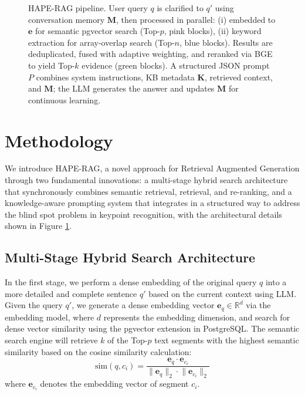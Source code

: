 \documentclass[10pt,twocolumn,letterpaper]{article}
\begin{document}
\begin{figure}[!htbp]
    \centering
    
    \caption{HAPE-RAG pipeline. User query $q$ is clarified to $q'$ using conversation memory $\mathbf{M}$, then processed in parallel: (i) embedded to $\mathbf{e}$ for semantic pgvector search (Top-$p$, pink blocks), (ii) keyword extraction for array-overlap search (Top-$n$, blue blocks). Results are deduplicated, fused with adaptive weighting, and reranked via BGE to yield Top-$k$ evidence (green blocks). A structured JSON prompt $P$ combines system instructions, KB metadata $\mathbf{K}$, retrieved context, and $\mathbf{M}$; the LLM generates the answer and updates $\mathbf{M}$ for continuous learning.}
    \label{fig:system_architecture}
\end{figure}

\section{Methodology}

We introduce HAPE-RAG, a novel approach for Retrieval Augmented Generation through two fundamental innovations: a multi-stage hybrid search architecture that synchronously combines semantic retrieval, retrieval, and re-ranking, and a knowledge-aware prompting system that integrates in a structured way to address the blind spot problem in keypoint recognition, with the architectural details shown in Figure \ref{fig:system_architecture}.

\subsection{Multi-Stage Hybrid Search Architecture}

In the first stage, we perform a dense embedding of the original query $q$ into a more detailed and complete sentence $q'$ based on the current context using LLM. Given the query $q'$, we generate a dense embedding vector $\mathbf{e}_q \in \mathbb{R}^d$ \quad via the embedding model, where $d$ represents the embedding dimension, and search for dense vector similarity using the pgvector extension in PostgreSQL. The semantic search engine will retrieve $k$ of the Top-$p$ text segments with the highest semantic similarity based on the cosine similarity calculation:
$$\text{sim}(q, c_i) = \frac{\mathbf{e}_q \cdot \mathbf{e}_{c_i}}{\lVert \mathbf{e}_q\rVert_2 \cdot \lVert\mathbf{e}_{c_i}\rVert_2}$$
where $\mathbf{e}_{c_i}$ denotes the embedding vector of segment $c_i$.
\end{document}
